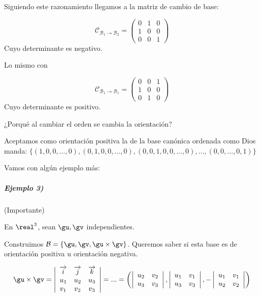 Siguiendo este razonamiento llegamos a la matriz de cambio de base:

\[\mathcal{C}_{\mathcal{B}_1\to\mathcal{B}_2} = \begin{pmatrix} 0 & 1 & 0 \\ 1 & 0 & 0 \\ 0 & 0 & 1 \end{pmatrix}\]
Cuyo determinante es negativo.

Lo mismo con 

\[\mathcal{C}_{\mathcal{B}_1\to\mathcal{B}_1} = \begin{pmatrix} 0 & 0 & 1 \\ 1 & 0 & 0 \\ 0 & 1 & 0 \end{pmatrix}\]
Cuyo determinante es positivo.

¿Porqué al cambiar el orden se cambia la orientación?

\obs Aceptamos como orientación positiva la de la base canónica ordenada como Dios manda: $\{(1,0,0,...,0), (0,1,0,0,...,0), (0,0,1,0,0,...,0),...,(0,0,...,0,1)\}$

Vamos con algún ejemplo más:

\subparagraph{Ejemplo 3)} (Importante)

En $\real^3$, sean $\gu,\gv$ independientes.

Construimos $\mathcal{B} = \{\gu,\gv,\gu\times\gv\}$. Queremos saber si esta base es de orientación positiva u orientación negativa.

\[\gu\times\gv = \left|
\begin{array}{ccc}
 \overrightarrow{i} & \overrightarrow{j} & \overrightarrow{k}\\
u_1 & u_2 & u_3 \\
v_1 & v_2 & v_3
 \end{array}\right| = ... = \left(\left|\begin{array}{cc}u_2&v_2\\u_3&v_3\end{array}\right|,\left|\begin{array}{cc}u_1&v_1\\u_3&v_3\end{array}\right|,-\left|\begin{array}{cc}u_1&v_1\\u_2&v_2\end{array}\right|\right)\]

